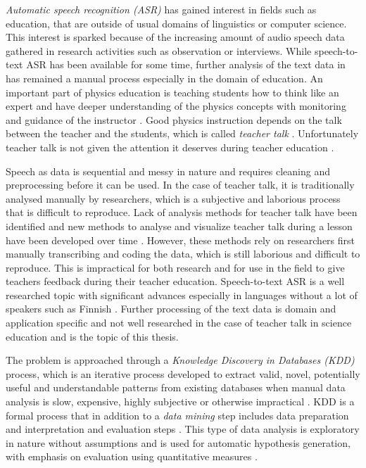 \documentclass[utf8,english]{gradu3}
\begin{document}
\emph{Automatic speech recognition (ASR)} has gained interest in fields such as education, that are outside of usual domains of linguistics or computer science. This interest is sparked because of the increasing amount of audio speech data gathered in research activities such as observation or interviews. While speech-to-text ASR has been available for some time, further analysis of the text data in has remained a manual process especially in the domain of education. An important part of physics education is teaching students how to think like an expert and have deeper understanding of the physics concepts with monitoring and guidance of the instructor \parencite{wiemanTransformingPhysicsEducation2007}. Good physics instruction depends on the talk between the teacher and the students, which is called \emph{teacher talk} \parencite{scottTeachingScienceMeaningful2007}. Unfortunately teacher talk is not given the attention it deserves during teacher education \parencite{crespoPraisingCorrectingProspective2002,lehesvuoriDialogicTeachingScience2013}. 

Speech as data is sequential and messy in nature and requires cleaning and preprocessing before it can be used. In the case of teacher talk, it is traditionally analysed manually by researchers, which is a subjective and laborious process that is difficult to reproduce. Lack of analysis methods for teacher talk have been identified and new methods to analyse and visualize teacher talk during a lesson have been developed over time \parencite{viiriTeacherTalkPatterns2006,lehesvuoriVisualizingCommunicationStructures2013}. However, these methods rely on researchers first manually transcribing and coding the data, which is still laborious and difficult to reproduce. This is impractical for both research and for use in the field to give teachers feedback during their teacher education. Speech-to-text ASR is a well researched topic with significant advances especially in languages without a lot of speakers such as Finnish \parencite{kurimoModelingUnderresourcedLanguages2017}. Further processing of the text data is domain and application specific and not well researched in the case of teacher talk in science education and is the topic of this thesis. 

The problem is approached through a \emph{Knowledge Discovery in Databases (KDD)} process, which is an iterative process developed to extract valid, novel, potentially useful and understandable patterns from existing databases when manual data analysis is slow, expensive, highly subjective or otherwise impractical \parencite{fayyadKDDProcessExtracting1996}. KDD is a formal process that in addition to a \emph{data mining} step includes data preparation and interpretation and evaluation steps \parencite{fayyadKDDProcessExtracting1996}. This type of data analysis is exploratory in nature without assumptions and is used for automatic hypothesis generation, with emphasis on evaluation using quantitative measures \parencite{fayyadKDDProcessExtracting1996}.
\end{document}

